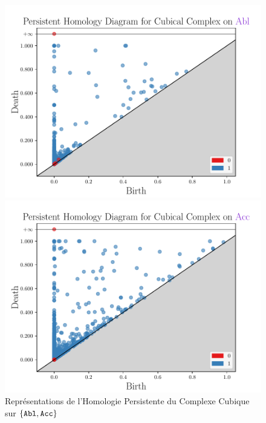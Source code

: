 \documentclass{cours}
\begin{document}
\begin{figure}
\begin{minipage}{.5\textwidth}
	\begin{center}
	\includegraphics[width=\linewidth]{Figures/Visualisations/cc_Abl}
	\end{center}
\end{minipage}
\begin{minipage}{.5\textwidth}
	\begin{center}
	\includegraphics[width=\linewidth]{Figures/Visualisations/cc_Acc}
	\end{center}
\end{minipage}
\caption{Représentations de l'Homologie Persistente du Complexe Cubique sur $\{\tt Abl,Acc\}$}
\label{fig_cc_hom}
\end{figure}
\end{document}
